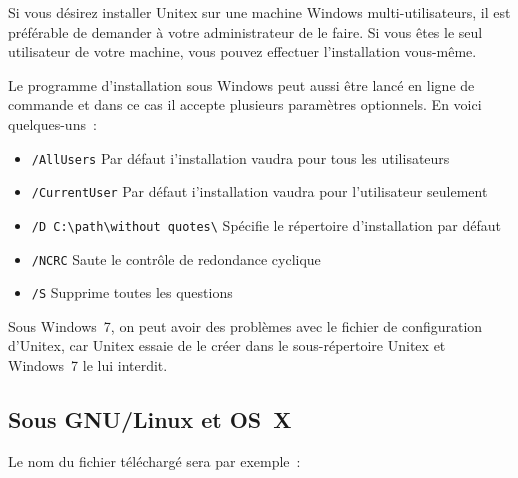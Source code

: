 \bigskip
\noindent Si vous désirez installer Unitex sur une machine Windows multi-utilisateurs, il est
préférable de demander à votre administrateur de le faire. Si vous êtes le seul utilisateur de
votre machine, vous pouvez effectuer l’installation vous-même.

\bigskip
\begin{samepage}
\noindent Le programme d'installation sous Windows peut aussi être lancé en ligne de commande et dans ce cas
il accepte plusieurs paramètres optionnels. En voici quelques-uns~:

\begin{itemize}
\itemsep1pt\parskip0pt
\item
  \texttt{/AllUsers} \hspace{.15in} Par défaut i'installation vaudra pour tous les utilisateurs\\
\item
  \texttt{/CurrentUser} \hspace{.15in} Par défaut i'installation vaudra pour l'utilisateur seulement\\
\item
  \texttt{/D C:\textbackslash{}path\textbackslash{}without quotes\textbackslash{}} \hspace{.15in}
  Spécifie le répertoire d'installation par défaut\\
\item
  \texttt{/NCRC} \hspace{.15in} Saute le contrôle de redondance cyclique\\
\item
  \texttt{/S} \hspace{.15in} Supprime toutes les questions
\end{itemize}
\end{samepage}

\noindent Sous Windows~7, on peut avoir des problèmes avec le fichier de configuration d'Unitex, car Unitex
essaie de le créer dans le sous-répertoire Unitex et Windows~7 le lui interdit.

\subsection{Sous GNU/Linux et OS~X}
Le nom du fichier téléchargé sera par exemple~:

\begin{flushleft}
{\tt \UnitexPackageLinux{}}
{\tt \UnitexPackageLinuxSF{}}
\end{flushleft}

